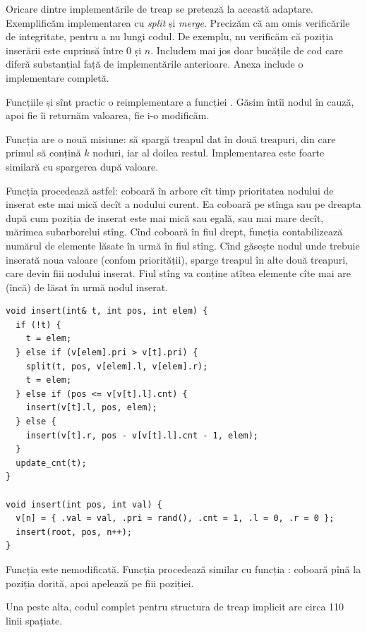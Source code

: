 \documentclass[../main.tex]{subfiles}
\begin{document}
Oricare dintre implementările de treap se pretează la această adaptare. Exemplificăm implementarea cu \textit{split} și \textit{merge}. Precizăm că am omis verificările de integritate, pentru a nu lungi codul. De exemplu, nu verificăm că poziția inserării este cuprinsă între $0$ și $n$. Includem mai jos doar bucățile de cod care diferă substanțial față de implementările anterioare. Anexa include o implementare completă.

Funcțiile  și  sînt practic o reimplementare a funcției . Găsim întîi nodul în cauză, apoi fie îi returnăm valoarea, fie i-o modificăm.

Funcția  are o nouă misiune: să spargă treapul dat în două treapuri, din care primul să conțină $k$ noduri, iar al doilea restul. Implementarea este foarte similară cu spargerea după valoare.

Funcția  procedează astfel: coboară în arbore cît timp prioritatea nodului de inserat este mai mică decît a nodului curent. Ea coboară pe stînga sau pe dreapta după cum poziția de inserat este mai mică sau egală, sau mai mare decît, mărimea subarborelui stîng. Cînd coboară în fiul drept, funcția contabilizează numărul de elemente lăsate în urmă în fiul stîng. Cînd găsește nodul unde trebuie inserată noua valoare (confom priorității), sparge treapul în alte două treapuri, care devin fiii nodului inserat. Fiul stîng va conține atîtea elemente cîte mai are (încă) de lăsat în urmă nodul inserat.

\begin{verbatim}
void insert(int& t, int pos, int elem) {
  if (!t) {
    t = elem;
  } else if (v[elem].pri > v[t].pri) {
    split(t, pos, v[elem].l, v[elem].r);
    t = elem;
  } else if (pos <= v[v[t].l].cnt) {
    insert(v[t].l, pos, elem);
  } else {
    insert(v[t].r, pos - v[v[t].l].cnt - 1, elem);
  }
  update_cnt(t);
}

void insert(int pos, int val) {
  v[n] = { .val = val, .pri = rand(), .cnt = 1, .l = 0, .r = 0 };
  insert(root, pos, n++);
}
\end{verbatim}

Funcția  este nemodificată. Funcția  procedează similar cu funcția : coboară pînă la poziția dorită, apoi apelează  pe fiii poziției.

Una peste alta, codul complet pentru structura de treap implicit are circa 110 linii spațiate.
\end{document}
